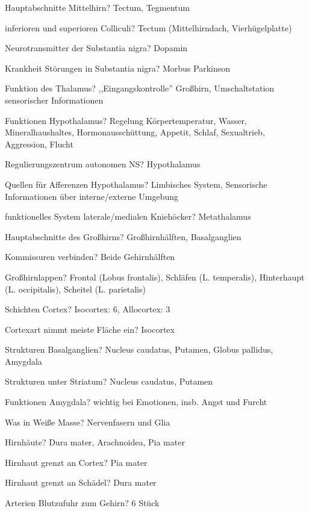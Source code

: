 \documentclass[a4paper]{article}
\begin{document}
\begin{multicols}{3}
  Hauptabschnitte Mittelhirn? Tectum, Tegmentum

  inferioren und superioren Colliculi? Tectum (Mittelhirndach, Vierhügelplatte)

  Neurotransmitter der Substantia nigra? Dopamin

  Krankheit Störungen in Substantia nigra? Morbus Parkinson

  Funktion des Thalamus? ,,Eingangskontrolle'' Großhirn, Umschaltstation sensorischer Informationen

  Funktionen Hypothalamus? Regelung Körpertemperatur, Wasser, Mineralhaushaltes, Hormonausschüttung, Appetit, Schlaf, Sexualtrieb, Aggression, Flucht

  Regulierungszentrum autonomen NS? Hypothalamus

  Quellen für Afferenzen Hypothalamus? Limbisches System, Sensorische Informationen über interne/externe Umgebung


  funktionelles System laterale/medialen Kniehöcker? Metathalamus

  Hauptabschnitte des Großhirns? Großhirnhälften, Basalganglien

  Kommissuren verbinden? Beide Gehirnhälften

  Großhirnlappen? Frontal (Lobus frontalis), Schläfen (L. temperalis), Hinterhaupt (L. occipitalis), Scheitel (L. parietalis)



  Schichten Cortex? Isocortex: 6, Allocortex: 3

  Cortexart nimmt meiste Fläche ein? Isocortex

  Strukturen Basalganglien? Nucleus caudatus, Putamen, Globus pallidus, Amygdala

  Strukturen unter Striatum? Nucleus caudatus, Putamen

  Funktionen Amygdala? wichtig bei Emotionen, insb. Angst und Furcht

  Was in Weiße Masse? Nervenfasern und Glia

  Hirnhäute? Dura mater, Arachnoidea, Pia mater

  Hirnhaut grenzt an Cortex? Pia mater

  Hirnhaut grenzt an Schädel? Dura mater

  Arterien Blutzufuhr zum Gehirn? 6 Stück


\end{multicols}
\end{document}
